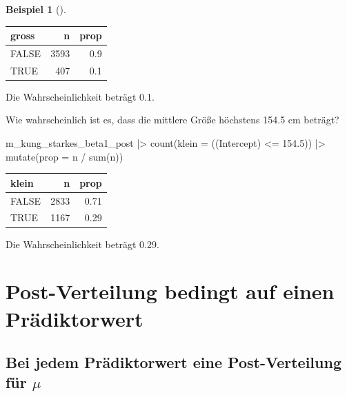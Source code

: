 \documentclass[
  ngerman,
  letterpaper,
  twoside,
  open=any]{scrbook}
\newenvironment{Shaded}{\begin{snugshade}}{\end{snugshade}}
\newcommand{\AttributeTok}[1]{\textcolor[rgb]{0.40,0.45,0.13}{#1}}
\newcommand{\FloatTok}[1]{\textcolor[rgb]{0.68,0.00,0.00}{#1}}
\newcommand{\FunctionTok}[1]{\textcolor[rgb]{0.28,0.35,0.67}{#1}}
\newcommand{\NormalTok}[1]{\textcolor[rgb]{0.00,0.23,0.31}{#1}}
\newcommand{\SpecialCharTok}[1]{\textcolor[rgb]{0.37,0.37,0.37}{#1}}
\newcommand{\StringTok}[1]{\textcolor[rgb]{0.13,0.47,0.30}{#1}}
\newcounter{none} %
\theoremstyle{definition}
\newtheorem{example}{Beispiel}[chapter]
\theoremstyle{plain}
\theoremstyle{definition}
\theoremstyle{definition}
\theoremstyle{remark}
\begin{document}
\begin{example}[]
{\def\LTcaptype{none} %
\begin{longtable}[]{@{}lrr@{}}
\toprule\noalign{}
gross & n & prop \\
\midrule\noalign{}
\endhead
\bottomrule\noalign{}
\endlastfoot
FALSE & 3593 & 0.9 \\
TRUE & 407 & 0.1 \\
\end{longtable}
}

Die Wahrscheinlichkeit beträgt 0.1.

Wie wahrscheinlich ist es, dass die mittlere Größe höchstens 154.5 cm
beträgt?

\begin{Shaded}
\begin{Highlighting}[]
\NormalTok{m\_kung\_starkes\_beta1\_post }\SpecialCharTok{|\textgreater{}} 
  \FunctionTok{count}\NormalTok{(}\AttributeTok{klein =}\NormalTok{ (}\StringTok{\textasciigrave{}}\AttributeTok{(Intercept)}\StringTok{\textasciigrave{}} \SpecialCharTok{\textless{}=} \FloatTok{154.5}\NormalTok{)) }\SpecialCharTok{|\textgreater{}} 
  \FunctionTok{mutate}\NormalTok{(}\AttributeTok{prop =}\NormalTok{ n }\SpecialCharTok{/} \FunctionTok{sum}\NormalTok{(n))}
\end{Highlighting}
\end{Shaded}

{\def\LTcaptype{none} %
\begin{longtable}[]{@{}lrr@{}}
\toprule\noalign{}
klein & n & prop \\
\midrule\noalign{}
\endhead
\bottomrule\noalign{}
\endlastfoot
FALSE & 2833 & 0.71 \\
TRUE & 1167 & 0.29 \\
\end{longtable}
}

Die Wahrscheinlichkeit beträgt 0.29.

\section{Post-Verteilung bedingt auf einen
Prädiktorwert}\label{post-verteilung-bedingt-auf-einen-pruxe4diktorwert}

\subsection{\texorpdfstring{Bei jedem Prädiktorwert eine Post-Verteilung
für
\(\mu\)}{Bei jedem Prädiktorwert eine Post-Verteilung für \textbackslash mu}}\label{bei-jedem-pruxe4diktorwert-eine-post-verteilung-fuxfcr-mu}


\end{example}
\end{document}
